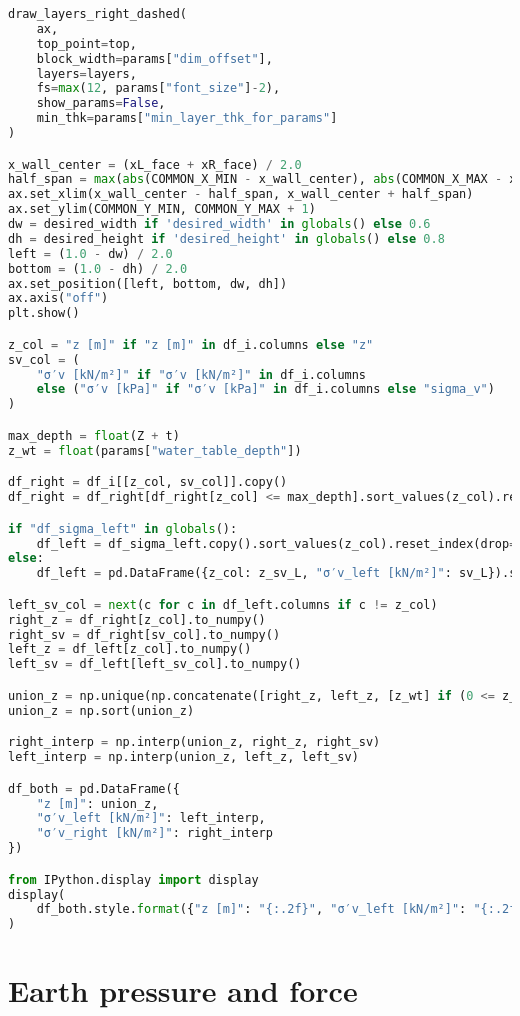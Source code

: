 \begin{lstlisting}[language=Python]
draw_layers_right_dashed(
    ax,
    top_point=top,
    block_width=params["dim_offset"],
    layers=layers,
    fs=max(12, params["font_size"]-2),
    show_params=False,
    min_thk=params["min_layer_thk_for_params"]
)

x_wall_center = (xL_face + xR_face) / 2.0
half_span = max(abs(COMMON_X_MIN - x_wall_center), abs(COMMON_X_MAX - x_wall_center))
ax.set_xlim(x_wall_center - half_span, x_wall_center + half_span)
ax.set_ylim(COMMON_Y_MIN, COMMON_Y_MAX + 1)
dw = desired_width if 'desired_width' in globals() else 0.6
dh = desired_height if 'desired_height' in globals() else 0.8
left = (1.0 - dw) / 2.0
bottom = (1.0 - dh) / 2.0
ax.set_position([left, bottom, dw, dh])
ax.axis("off")
plt.show()

z_col = "z [m]" if "z [m]" in df_i.columns else "z"
sv_col = (
    "σ′v [kN/m²]" if "σ′v [kN/m²]" in df_i.columns
    else ("σ′v [kPa]" if "σ′v [kPa]" in df_i.columns else "sigma_v")
)

max_depth = float(Z + t)
z_wt = float(params["water_table_depth"])

df_right = df_i[[z_col, sv_col]].copy()
df_right = df_right[df_right[z_col] <= max_depth].sort_values(z_col).reset_index(drop=True)

if "df_sigma_left" in globals():
    df_left = df_sigma_left.copy().sort_values(z_col).reset_index(drop=True)
else:
    df_left = pd.DataFrame({z_col: z_sv_L, "σ′v_left [kN/m²]": sv_L}).sort_values(z_col).reset_index(drop=True)

left_sv_col = next(c for c in df_left.columns if c != z_col)
right_z = df_right[z_col].to_numpy()
right_sv = df_right[sv_col].to_numpy()
left_z = df_left[z_col].to_numpy()
left_sv = df_left[left_sv_col].to_numpy()

union_z = np.unique(np.concatenate([right_z, left_z, [z_wt] if (0 <= z_wt <= max_depth) else []]))
union_z = np.sort(union_z)

right_interp = np.interp(union_z, right_z, right_sv)
left_interp = np.interp(union_z, left_z, left_sv)

df_both = pd.DataFrame({
    "z [m]": union_z,
    "σ′v_left [kN/m²]": left_interp,
    "σ′v_right [kN/m²]": right_interp
})

from IPython.display import display
display(
    df_both.style.format({"z [m]": "{:.2f}", "σ′v_left [kN/m²]": "{:.2f}", "σ′v_right [kN/m²]": "{:.2f}"})
)
\end{lstlisting}

\section{Earth pressure and force}

